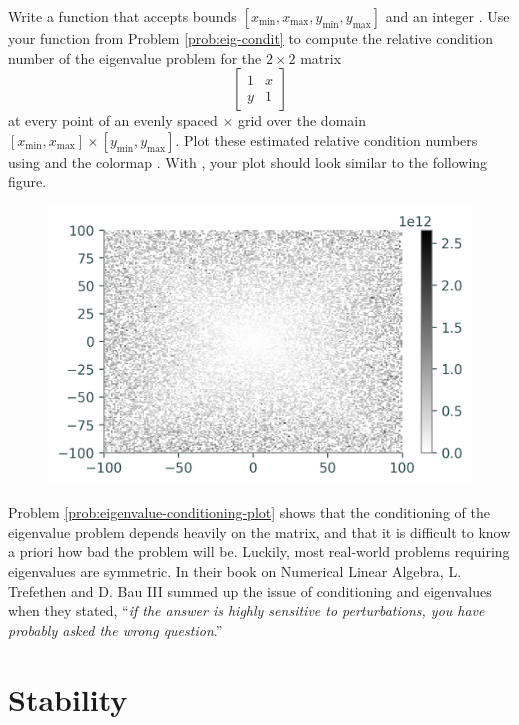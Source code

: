 \begin{problem}
Write a function that accepts bounds $[x_{\min},x_{\max},y_{\min},y_{\max}]$ and an integer .
Use your function from Problem \ref{prob:eig-condit} to compute the relative condition number of the eigenvalue problem for the $2\times 2$ matrix
\[
\left[\begin{array}{cc}
1 &  x\\
y & 1\end{array}\right]
\]
at every point of an evenly spaced $\times$ grid over the domain $[x_{\min}, x_{\max}]\times [y_{\min}, y_{\max}]$.
Plot these estimated relative condition numbers using  and the colormap .
With , your plot should look similar to the following figure.

\begin{figure}[H]
    \includegraphics[width=.7\linewidth]{figures/eigenvalue_conditioning.png}
\end{figure}

\label{prob:eigenvalue-conditioning-plot}
\end{problem}

Problem \ref{prob:eigenvalue-conditioning-plot} shows that the conditioning of the eigenvalue problem depends heavily on the matrix, and that it is difficult to know a priori how bad the problem will be.
Luckily, most real-world problems requiring eigenvalues are symmetric.
In their book on Numerical Linear Algebra, L. Trefethen and D. Bau III summed up the issue of conditioning and eigenvalues when they stated, ``\emph{if the answer is highly sensitive to perturbations, you have probably asked the wrong question}.''

\section*{Stability} %

